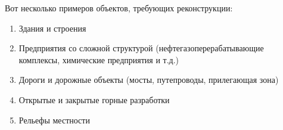 Вот несколько примеров объектов, требующих реконструкции:
\begin{enumerate}
\item Здания и строения
\item Предприятия со сложной структурой (нефтегазоперерабатывающие комплексы, химические предприятия и т.д.)
\item Дороги и дорожные объекты (мосты, путепроводы, прилегающая зона)
\item Открытые и закрытые горные разработки
\item Рельефы местности
\end{enumerate}
